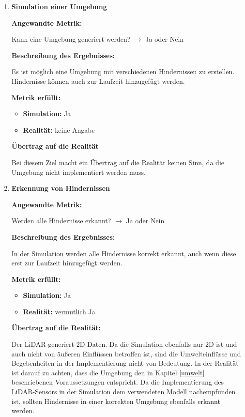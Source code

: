 \begin{enumerate}[leftmargin=*]
    \item \textbf{Simulation einer Umgebung}
    
    \textbf{Angewandte Metrik:}

    Kann eine Umgebung generiert werden? $\to$ Ja oder Nein

    \textbf{Beschreibung des Ergebnisses:}

    Es ist möglich eine Umgebung mit verschiedenen Hindernissen zu erstellen. 
    Hindernisse können auch zur Laufzeit hinzugefügt werden. 

    \textbf{Metrik erfüllt:}
    
    \begin{itemize}
        \item \textbf{Simulation:} Ja
        \item \textbf{Realität:} keine Angabe
    \end{itemize}

    \textbf{Übertrag auf die Realität}

    Bei diesem Ziel macht ein Übertrag auf die Realität keinen Sinn, da die Umgebung nicht implementiert werden muss.
    \item \textbf{Erkennung von Hindernissen}

    \textbf{Angewandte Metrik:}

    Werden alle Hindernisse erkannt? $\to$ Ja oder Nein

    \textbf{Beschreibung des Ergebnisses:}

    In der Simulation werden alle Hindernisse korrekt erkannt, auch wenn diese erst zur Laufzeit hinzugefügt werden. 

    \textbf{Metrik erfüllt:}
    \begin{itemize}
        \item \textbf{Simulation:} Ja
        \item \textbf{Realität:} vermutlich Ja
    \end{itemize}
    
    \textbf{Übertrag auf die Realität:}

    Der LiDAR generiert 2D-Daten. Da die Simulation ebenfalls nur 2D ist und auch nicht von äußeren Einflüssen betroffen ist,
    sind die Umwelteinflüsse und Begebenheiten in der Implementierung nicht von Bedeutung.
    In der Realität ist darauf zu achten, dass die Umgebung den in Kapitel \ref{umwelt} beschriebenen Voraussetzungen entspricht. 
    Da die Implementierung des LiDAR-Sensors in der Simulation dem verwendeten Modell nachempfunden ist, 
    sollten Hindernisse in einer korrekten Umgebung ebenfalls erkannt werden.



\end{enumerate}
